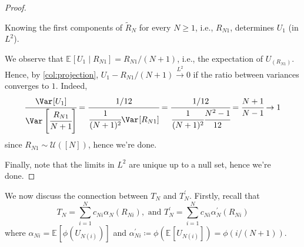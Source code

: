 \begin{proof}
	\begin{claim}\label{clm:simple-linear-rank-statistic}
		Knowing the first components of \(\widetilde{R} _N\) for every \(N\geq 1\), i.e., \(R_{N1}\), determines \(U_1\) (in \(L^2\)).
	\end{claim}
	\begin{explanation}
		We observe that \(\mathbb{E}_{}[U_1 \mid R_{N1}] = R_{N1} / (N+1)\), i.e., the expectation of \(U_{(R_{N1})}\). Hence, by \autoref{col:projection}, \(U_1 - R_{N1} / (N+1) \overset{L^2}{\to} 0\) if the ratio between variances converges to \(1\). Indeed,
		\[
			\cfrac{\Var_{}[U_1] }{\Var_{}\left[\cfrac{R_{N1}}{N+1}\right] }
			= \cfrac{1 / 12}{\cfrac{1}{(N+1)^2}\Var_{}[R_{N1}] }
			= \cfrac{1 / 12}{\cfrac{1}{(N+1)^2} \cfrac{N^2 - 1}{12}}
			= \cfrac{N+1}{N - 1}
			\to 1
		\]
		since \(R_{N1} \sim \mathcal{U} ([N])\), hence we're done.
	\end{explanation}
	Finally, note that the limits in \(L^2\) are unique up to a null set, hence we're done.
\end{proof}

We now discuss the connection between \(T_N\) and \(T_N^{\prime} \). Firstly, recall that
\[
	T_N = \sum_{i=1}^{N} c_{Ni} \alpha _N(R_{Ni}), \text{ and }
	T_N^{\prime} = \sum_{i=1}^{N} c_{Ni} \alpha _N^{\prime} (R_{Ni})
\]
where \(\alpha _{Ni} = \mathbb{E}_{}[\phi (U_{N(i)})] \) and \(\alpha _{Ni}^{\prime} \coloneqq \phi (\mathbb{E}_{}[U_{N(i)}] ) = \phi (i / (N+1))\).

